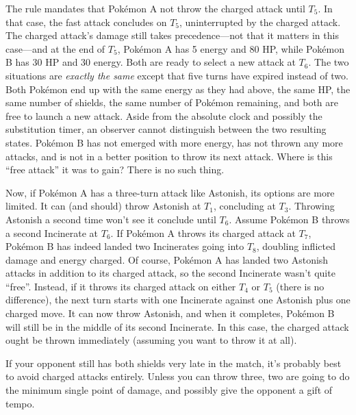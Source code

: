 The rule mandates that Pokémon A not throw the charged attack until $T_5$.
In that case, the fast attack concludes on $T_5$, uninterrupted by the charged attack.
The charged attack's damage still takes precedence---not that it matters in this case---and at the
  end of $T_5$, Pokémon A has 5 energy and 80 HP, while Pokémon B has 30 HP and 30 energy.
Both are ready to select a new attack at $T_6$.
The two situations are \textit{exactly the same} except that five turns have expired instead of two.
Both Pokémon end up with the same energy as they had above, the same HP, the same number of shields,
  the same number of Pokémon remaining, and both are free to launch a new attack.
Aside from the absolute clock and possibly the substitution timer, an observer cannot distinguish
  between the two resulting states.
Pokémon B has not emerged with more energy, has not thrown any more attacks, and is not in a better
  position to throw its next attack.
Where is this ``free attack'' it was to gain?
There is no such thing.

Now, if Pokémon A has a three-turn attack like Astonish, its options are more limited.
It can (and should) throw Astonish at $T_1$, concluding at $T_3$.
Throwing Astonish a second time won't see it conclude until $T_6$.
Assume Pokémon B throws a second Incinerate at $T_6$.
If Pokémon A throws its charged attack at $T_7$, Pokémon B has indeed landed two Incinerates going into $T_8$,
  doubling inflicted damage and energy charged.
Of course, Pokémon A has landed two Astonish attacks in addition to its charged attack, so the
  second Incinerate wasn't quite ``free''.
Instead, if it throws its charged attack on either $T_4$ or $T_5$ (there is no difference),
 the next turn starts with one Incinerate against one Astonish plus one charged move.
It can now throw Astonish, and when it completes, Pokémon B will still be in the middle of its second Incinerate.
In this case, the charged attack ought be thrown immediately (assuming you want to throw it at all).

If your opponent still has both shields very late in the match, it's probably
 best to avoid charged attacks entirely.
Unless you can throw three, two are going to do the minimum single point of damage,
 and possibly give the opponent a gift of tempo.

